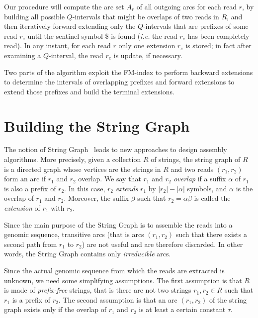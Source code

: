 \documentclass[runningheads,envcountsame,a4paper]{llncs}
\newcommand{\ie}{\textit{i.e.}\xspace}
\begin{document}

Our procedure will compute the arc set $A_r$ of all outgoing arcs for each read $r$,
by building all possible $Q$-intervals that might be overlaps of two
reads in $R$, and then iteratively forward extending only the $Q$-intervals that
are prefixes of some read $r_{e}$ until the sentinel symbol \$ is
found (\ie the read $r_{e}$ has been completely read).
In any instant, for each read $r$ only one extension $r_{e}$ is stored; in fact after examining a $Q$-interval, the read $r_{e}$ is update, if necessary.



Two parts of the algorithm exploit the FM-index to perform
backward extensions to determine the intervals of overlapping
prefixes and forward extensions to extend those prefixes and build the
terminal extensions.


\section{Building the String Graph}

The notion of String Graph~\cite{Simpson2010} leads to new approaches to design assembly algorithms.
More precisely, given a collection $R$ of strings, the string graph of $R$ is a directed graph whose vertices are the strings in $R$ and two reads $(r_{1}, r_{2})$ form an arc if $r_{1}$ and $r_{2}$ overlap.
We say that $r_1$ and $r_2$
\emph{overlap} if a suffix $\alpha$ of $r_1$ is also a prefix of $r_2$.
In this case,
$r_2$ \emph{extends} $r_1$ by $|r_2|- |\alpha|$ symbols, and $\alpha$ is the overlap of $r_{1}$ and $r_{2}$.
Moreover,
the suffix $\beta$ such that $r_2 = \alpha \beta$ is called the
\emph{extension} of $r_1$ with $r_{2}$.

Since the main purpose of the String Graph is to assemble the reads into a genomic sequence, transitive arcs (that is arcs $(r_{1}, r_{2})$ such that there exists a second path from $r_{1}$ to $r_{2}$) are not useful and are therefore discarded.
In other words, the String Graph contains only \emph{irreducible} arcs.


Since the actual genomic sequence from which the reads are extracted is unknown, we need some simplifying assumptions.
The first assumption is that $R$ is made of \emph{prefix-free} strings, that is there are not two strings $r_{1}, r_{2}\in R$ such that
$r_{1}$  is a prefix of  $r_{2}$.
The second assumption is that an arc $(r_{1}, r_{2})$ of the string graph exists only if the overlap of $r_{1}$ and $r_{2}$ is at least a certain constant $\tau$.
\end{document}
